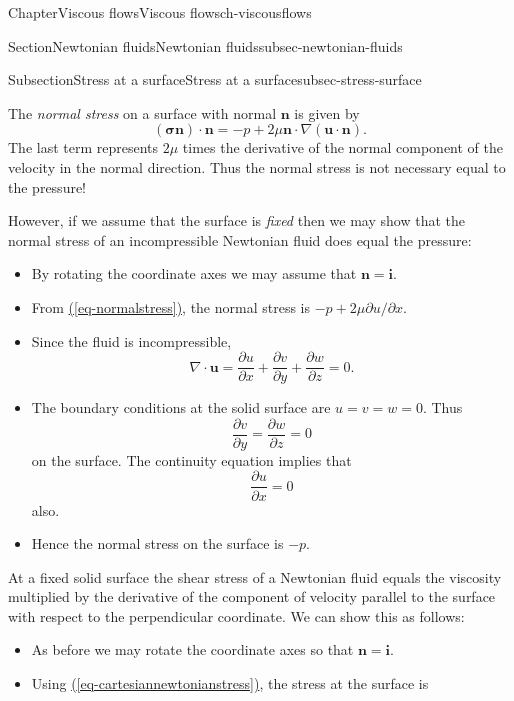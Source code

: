 \documentclass[oneside,10pt,]{book}
\newcommand{\xreffont}{\relax}
\newcommand{\ptxlistdisc}{\raisebox{0.3ex}{\textbullet}}
\numberwithin{equation}{section}
\newcommand{\pd}[2]{\frac{\partial#1}{\partial#2}}
\newcommand{\bn}{\boldsymbol{n}}
\newcommand{\bu}{\boldsymbol{u}}
\newcommand{\bsigma}{\boldsymbol{\sigma}}
\newcommand{\bi}{\boldsymbol{i}}
\begin{document}
\begin{chapterptx}{Chapter}{Viscous flows}{}{Viscous flows}{}{}{ch-viscousflows}
\begin{sectionptx}{Section}{Newtonian fluids}{}{Newtonian fluids}{}{}{subsec-newtonian-fluids}
\begin{subsectionptx}{Subsection}{Stress at a surface}{}{Stress at a surface}{}{}{subsec-stress-surface}
\par
The \emph{normal stress} on a surface with normal \(\bn\) is given by%
\begin{equation}
\left(\bsigma\bn\right)\cdot\bn
=-p+2\mu\bn\cdot\nabla\left(\bu\cdot\bn\right).\label{eq-normalstress}
\end{equation}
The last term represents \(2\mu\) times the derivative of the normal component of the velocity in the normal direction. Thus the normal stress is not necessary equal to the pressure!%
\par
However, if we assume that the surface is \emph{fixed} then we may show that the normal stress of an incompressible Newtonian fluid does equal the pressure:%
\begin{itemize}[label=\ptxlistdisc]
\item{}By rotating the coordinate axes we may assume that \(\bn=\bi\).%
\item{}From \hyperref[eq-normalstress]{({\xreffont\ref{eq-normalstress}})}, the normal stress is \(-p+2\mu\partial u/\partial x\).%
\item{}Since the fluid is incompressible,%
\begin{equation*}
\nabla\cdot\bu=\pd{u}{x}+\pd{v}{y}+\pd{w}{z}=0.
\end{equation*}
%
\item{}The boundary conditions at the solid surface are \(u=v=w=0\). Thus%
\begin{equation*}
\pd{v}{y}=\pd{w}{z}=0
\end{equation*}
on the surface. The continuity equation implies that%
\begin{equation*}
\pd{u}{x}=0
\end{equation*}
also.%
\item{}Hence the normal stress on the surface is \(-p\).%
\end{itemize}
%
\par
At a fixed solid surface the shear stress of a Newtonian fluid equals the viscosity multiplied by the derivative of the component of velocity parallel to the surface with respect to the perpendicular coordinate. We can show this as follows:%
\begin{itemize}[label=\ptxlistdisc]
\item{}As before we may rotate the coordinate axes so that \(\bn=\bi\).%
\item{}Using \hyperref[eq-cartesiannewtonianstress]{({\xreffont\ref{eq-cartesiannewtonianstress}})}, the stress at the surface is%
\begin{equation*}

\end{equation*}
\end{itemize}
\end{subsectionptx}
\end{sectionptx}
\end{chapterptx}
\end{document}
